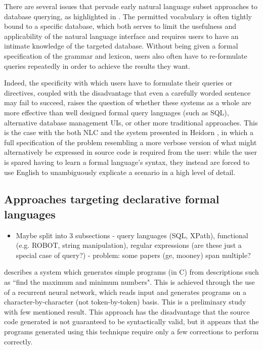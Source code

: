 \documentclass[a4paper,11pt]{proposal}
\begin{document}
There are several issues that pervade early natural language subset approaches to database querying, as highlighted in \cite{capindale1990}. The permitted vocabulary is often tightly bound to a specific database, which both serves to limit the usefulness and applicability of the natural language interface and requires users to have an intimate knowledge of the targeted database. Without being given a formal specification of the grammar and lexicon, users also often have to re-formulate queries repeatedly in order to achieve the results they want. 

Indeed, the specificity with which users have to formulate their queries or directives, coupled with the disadvantage that even a carefully worded sentence may fail to succeed, raises the question of whether these systems as a whole are more effective than well designed formal query languages (such as SQL), alternative database management UIs, or other more traditional approaches. This is the case with the both NLC and the system presented in Heidorn \cite{heidorn1974}, in which a full specification of the problem resembling a more verbose version of what might alternatively be expressed in source code is required from the user: while the user is spared having to learn a formal language's syntax, they instead are forced to use English to unambiguously explicate a scenario in a high level of detail.

\subsection{Approaches targeting declarative formal languages}
\begin{itemize}
\item Maybe split into 3 subsections - query languages (SQL, XPath), functional (e.g. ROBOT, string manipulation), regular expressions (are these just a special case of query?) - problem: some papers (ge, mooney) span multiple?
\end{itemize}

\cite{mou2015} describes a system which generates simple programs (in C) from descriptions such as ``find the maximum and minimum numbers". This is achieved through the use of a recurrent neural network, which reads input and generates programs on a character-by-character (not token-by-token) basis. This is a preliminary study with few mentioned result. This approach has the disadvantage that the source code generated is not guaranteed to be syntactically valid, but it appears that the programs generated using this technique require only a few corrections to perform correctly.
\end{document}
